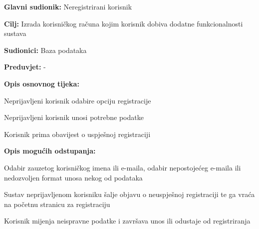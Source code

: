 						
						\noindent {}
					\begin{packed_item}
	
						\item \textbf{Glavni sudionik: }Neregistrirani korisnik
						\item  \textbf{Cilj:} Izrada korisničkog računa kojim korisnik dobiva dodatne funkcionalnosti sustava
						\item  \textbf{Sudionici:} Baza podataka
						\item  \textbf{Preduvjet:} -
						\item  \textbf{Opis osnovnog tijeka:}
						
						\item[] \begin{packed_enum}
	
							\item Neprijavljeni korisnik odabire opciju registracije
							\item Neprijavljeni korisnik unosi potrebne podatke
							\item Korisnik prima obavijest o uspješnoj registraciji
						\end{packed_enum}
					
						\item  \textbf{Opis mogućih odstupanja:}
						
						\item[] \begin{packed_item}
	
							\item[2.a]
							Odabir zauzetog korisničkog imena ili e-maila, odabir nepostojećeg e-maila ili nedozvoljen format unosa nekog od podataka
							\item[] \begin{packed_enum}
								
								\item Sustav neprijavljenom korisniku šalje objavu o neuspješnoj registraciji te ga vraća na početnu stranicu za registraciju
								\item Korisnik mijenja neispravne podatke i završava unos ili odustaje od registriranja
								
							\end{packed_enum}
						\end{packed_item}
					\end{packed_item}
					
